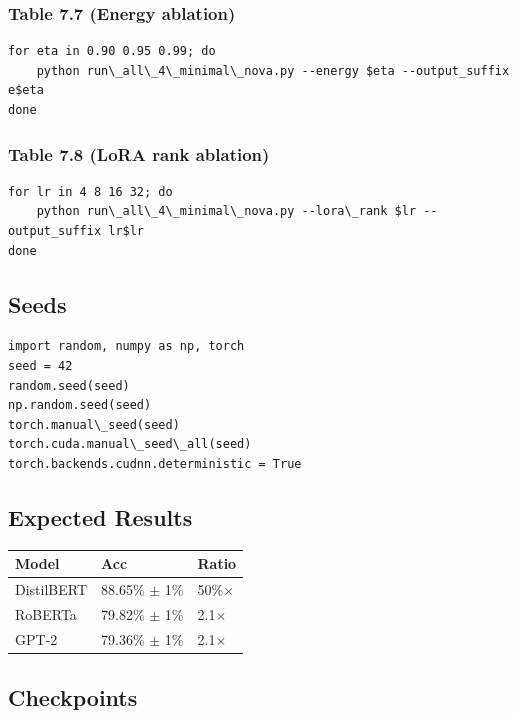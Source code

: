 \subsubsection{Table 7.7 (Energy ablation)}

\begin{lstlisting}
for eta in 0.90 0.95 0.99; do
    python run\_all\_4\_minimal\_nova.py --energy $eta --output_suffix e$eta
done
\end{lstlisting}

\subsubsection{Table 7.8 (LoRA rank ablation)}

\begin{lstlisting}
for lr in 4 8 16 32; do
    python run\_all\_4\_minimal\_nova.py --lora\_rank $lr --output_suffix lr$lr
done
\end{lstlisting}

\subsection{Seeds}

\begin{lstlisting}
import random, numpy as np, torch
seed = 42
random.seed(seed)
np.random.seed(seed)
torch.manual\_seed(seed)
torch.cuda.manual\_seed\_all(seed)
torch.backends.cudnn.deterministic = True
\end{lstlisting}

\subsection{Expected Results}

\begin{table}[H]
\centering
\small
\begin{tabular}{lll}
\toprule
\textbf{Model} & \textbf{Acc} & \textbf{Ratio} \\
\midrule
DistilBERT & 88.65\% $\pm$ 1\% & 50\%$\times$ \\
RoBERTa & 79.82\% $\pm$ 1\% & 2.1$\times$ \\
GPT-2 & 79.36\% $\pm$ 1\% & 2.1$\times$ \\
\bottomrule
\end{tabular}
\end{table}

\subsection{Checkpoints}

